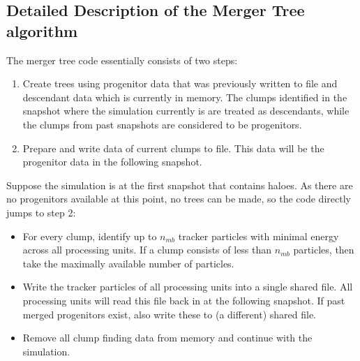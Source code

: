 \begin{appendices}
\setcounter{equation}{0}
\renewcommand{\theequation}{\Alph{section}.\arabic{equation}}


\section{Detailed Description of the Merger Tree algorithm}\label{app:detailed_mergertree}


The merger tree code essentially consists of two steps:

\begin{enumerate}
	
	\item Create trees using progenitor data that was previously written to file and descendant data which is currently in memory.
    The clumps identified in the snapshot where the simulation currently is are treated as descendants, while the clumps from past snapshots are considered to be progenitors.
	
	\item Prepare and write data of current clumps to file. 
	This data will be the progenitor data in the following snapshot.
	
\end{enumerate}

Suppose the simulation is at the first snapshot that contains haloes.
As there are no progenitors available at this point, no trees can be made, so the code directly jumps to step 2:

\begin{itemize}
	
	\item For every clump, identify up to $n_{mb}$ tracker particles with minimal energy across all processing units.
	If a clump consists of less than $n_{mb}$ particles, then take the maximally available number of particles.
	
	\item Write the tracker particles of all processing units into a single shared file. 
	All processing units will read this file back in at the following snapshot.
	If past merged progenitors exist, also write these to (a different) shared file.
	
	\item Remove all clump finding data from memory and continue with the simulation.
	

\end{itemize}
\end{appendices}
